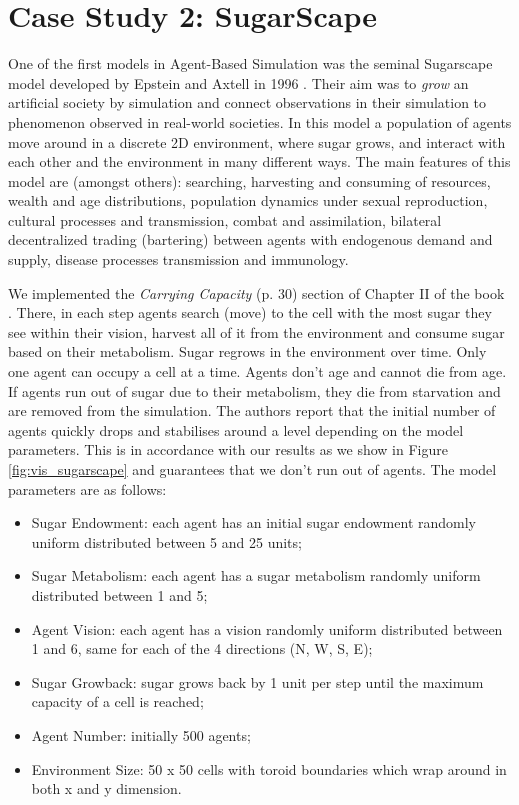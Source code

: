 \section{Case Study 2: SugarScape} %
\label{sec:cs_sugarscape}

One of the first models in Agent-Based Simulation was the seminal Sugarscape model developed by Epstein and Axtell in 1996 \cite{epstein_growing_1996}. Their aim was to \textit{grow} an artificial society by simulation and connect observations in their simulation to phenomenon observed in real-world societies. In this model a population of agents move around in a discrete 2D environment, where sugar grows, and interact with each other and the environment in many different ways. The main features of this model are (amongst others): searching, harvesting and consuming of resources, wealth and age distributions, population dynamics under sexual reproduction, cultural processes and transmission, combat and assimilation, bilateral decentralized trading (bartering) between agents with endogenous demand and supply, disease processes transmission and immunology.

We implemented the \textit{Carrying Capacity} (p. 30) section of Chapter II of the book \cite{epstein_growing_1996}. There, in each step agents search (move) to the cell with the most sugar they see within their vision, harvest all of it from the environment and consume sugar based on their metabolism. Sugar regrows in the environment over time. Only one agent can occupy a cell at a time. Agents don't age and cannot die from age. If agents run out of sugar due to their metabolism, they die from starvation and are removed from the simulation. The authors report that the initial number of agents quickly drops and stabilises around a level depending on the model parameters. This is in accordance with our results as we show in Figure \ref{fig:vis_sugarscape} and guarantees that we don't run out of agents. The model parameters are as follows:

\begin{itemize}
	\item Sugar Endowment: each agent has an initial sugar endowment randomly uniform distributed between 5 and 25 units;
	\item Sugar Metabolism: each agent has a sugar metabolism randomly uniform distributed between 1 and 5;
	\item Agent Vision: each agent has a vision randomly uniform distributed between 1 and 6, same for each of the 4 directions (N, W, S, E);
	\item Sugar Growback: sugar grows back by 1 unit per step until the maximum capacity of a cell is reached;
	\item Agent Number: initially 500 agents;
	\item Environment Size: 50 x 50 cells with toroid boundaries which wrap around in both x and y dimension.
\end{itemize}

